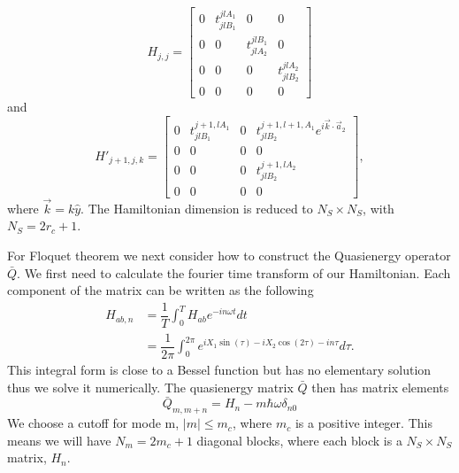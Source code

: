 \[
  H_{j,j} =
  \begin{bmatrix}
    0 & t^{jlA_1}_{jlB_1} & 0 & 0 \\
    0 & 0 & t^{jlB_1}_{jlA_2} & 0 \\
    0 & 0 & 0 & t^{jlA_2}_{jlB_2} \\
    0 & 0 & 0 & 0
  \end{bmatrix}
\]
and
\[
  H'_{j+1,j,k} =
  \begin{bmatrix}
    0 & t^{j+1,lA_1}_{jlB_1} & 0 & t^{j+1,l+1,A_1}_{jlB_2} e^{i\vec{k}\cdot\vec{a}_2} \\
    0 & 0 & 0 & 0 \\
    0 & 0 & 0 & t^{j+1,lA_2}_{jlB_2} \\
    0 & 0 & 0 & 0
  \end{bmatrix},
\]
where $\vec{k} = k \hat{y}$.
The Hamiltonian dimension is reduced to $N_S \times N_S$, with $N_S = 2r_c+1$.

For Floquet theorem we next consider how to construct the Quasienergy operator $\bar{Q}$.
We first need to calculate the fourier time transform of our Hamiltonian.
Each component of the matrix can be written as the following
\begin{align}
  H_{ab, n} &= \dfrac{1}{T} \int^T_0 H_{ab} e^{-i n \omega t} dt \nonumber \\
  &= \dfrac{1}{2\pi} \int^{2\pi}_0 e^{iX_1\sin(\tau) - iX_2\cos(2\tau) - i n \tau} d\tau.
\end{align}
This integral form is close to a Bessel function but has no elementary solution thus we solve it numerically.
The quasienergy matrix $\bar{Q}$ then has matrix elements
\begin{equation}
  \bar{Q}_{m,m+n} = H_n - m \hbar \omega \delta_{n0}
\end{equation}
We choose a cutoff for mode m, $|m| \leq m_c$, where $m_c$ is a positive integer.
This means we will have $N_m = 2 m_c +1$ diagonal blocks, where each block is a $N_S \times N_S$ matrix, $H_n$.

